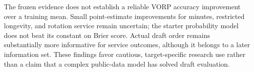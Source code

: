The frozen evidence does not establish a reliable VORP accuracy improvement over a training mean. Small point-estimate improvements for minutes, restricted longevity, and rotation service remain uncertain; the starter probability model does not beat its constant on Brier score. Actual draft order remains substantially more informative for service outcomes, although it belongs to a later information set. These findings favor cautious, target-specific research use rather than a claim that a complex public-data model has solved draft evaluation.

